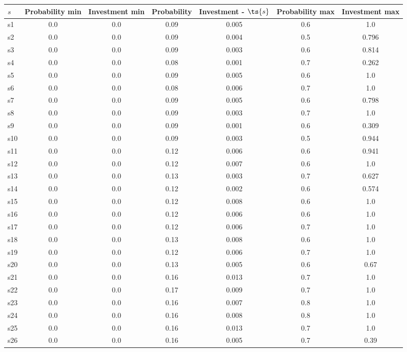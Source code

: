 \documentclass{article}
\begin{document}
\noindent\begin{tabular}{|l|c|c|c|c|c|c|}
\hline
$s$& Probability min & Investment min & Probability & Investment - $\ts{s}$ & Probability max & Investment max\\
\hline
s1 &0.0 & 0.0 & 0.09 & 0.005 & 0.6 & 1.0\\
\hline
s2 &0.0 & 0.0 & 0.09 & 0.004 & 0.5 & 0.796\\
\hline
s3 &0.0 & 0.0 & 0.09 & 0.003 & 0.6 & 0.814\\
\hline
s4 &0.0 & 0.0 & 0.08 & 0.001 & 0.7 & 0.262\\
\hline
s5 &0.0 & 0.0 & 0.09 & 0.005 & 0.6 & 1.0\\
\hline
s6 &0.0 & 0.0 & 0.08 & 0.006 & 0.7 & 1.0\\
\hline
s7 &0.0 & 0.0 & 0.09 & 0.005 & 0.6 & 0.798\\
\hline
s8 &0.0 & 0.0 & 0.09 & 0.003 & 0.7 & 1.0\\
\hline
s9 &0.0 & 0.0 & 0.09 & 0.001 & 0.6 & 0.309\\
\hline
s10 &0.0 & 0.0 & 0.09 & 0.003 & 0.5 & 0.944\\
\hline
s11 &0.0 & 0.0 & 0.12 & 0.006 & 0.6 & 0.941\\
\hline
s12 &0.0 & 0.0 & 0.12 & 0.007 & 0.6 & 1.0\\
\hline
s13 &0.0 & 0.0 & 0.13 & 0.003 & 0.7 & 0.627\\
\hline
s14 &0.0 & 0.0 & 0.12 & 0.002 & 0.6 & 0.574\\
\hline
s15 &0.0 & 0.0 & 0.12 & 0.008 & 0.6 & 1.0\\
\hline
s16 &0.0 & 0.0 & 0.12 & 0.006 & 0.6 & 1.0\\
\hline
s17 &0.0 & 0.0 & 0.12 & 0.006 & 0.7 & 1.0\\
\hline
s18 &0.0 & 0.0 & 0.13 & 0.008 & 0.6 & 1.0\\
\hline
s19 &0.0 & 0.0 & 0.12 & 0.006 & 0.7 & 1.0\\
\hline
s20 &0.0 & 0.0 & 0.13 & 0.005 & 0.6 & 0.67\\
\hline
s21 &0.0 & 0.0 & 0.16 & 0.013 & 0.7 & 1.0\\
\hline
s22 &0.0 & 0.0 & 0.17 & 0.009 & 0.7 & 1.0\\
\hline
s23 &0.0 & 0.0 & 0.16 & 0.007 & 0.8 & 1.0\\
\hline
s24 &0.0 & 0.0 & 0.16 & 0.008 & 0.8 & 1.0\\
\hline
s25 &0.0 & 0.0 & 0.16 & 0.013 & 0.7 & 1.0\\
\hline
s26 &0.0 & 0.0 & 0.16 & 0.005 & 0.7 & 0.39\\

\end{tabular}
\end{document}
